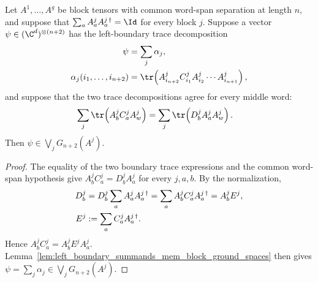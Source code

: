\begin{lemma}
    \label{lem:left_boundary_trace_decomposition_mem_block_ground_spaces}
    \leanok
    Let $A^1,\ldots,A^g$ be block tensors with common word-span separation at
    length $n$, and suppose that
    $\sum_a A^j_a A^{j\,\dagger}_a = \Id$
    for every block $j$. Suppose a vector
    $\psi\in(\C^d)^{\otimes(n+2)}$ has the left-boundary trace decomposition
    \begin{align}
        \psi
         & =
        \sum_j\alpha_j,
        \notag \\
        \alpha_j(i_1,\ldots,i_{n+2})
         & =
        \tr\!\left(A^j_{i_{n+2}} C^j_{i_1}
        A^j_{i_2}\cdots A^j_{i_{n+1}}\right),
        \notag
    \end{align}
    and suppose that the two trace decompositions agree for every middle word:
    \begin{align}
        \sum_j
        \tr\!\left(A^j_b C^j_a A^j_w\right)
         & =
        \sum_j
        \tr\!\left(D^j_b A^j_a A^j_w\right).
        \notag
    \end{align}
    Then
    $\psi \in \bigvee_j G_{n+2}(A^j)$.
\end{lemma}

\begin{proof}
    \leanok
    The equality of the two boundary trace expressions and the common word-span
    hypothesis give
    $A^j_bC^j_a = D^j_bA^j_a$
    for every $j,a,b$. By the normalization,
    \begin{align}
        D^j_b & = D^j_b\sum_a A^j_aA^{j\,\dagger}_a = \sum_a A^j_bC^j_aA^{j\,\dagger}_a = A^j_bE^j,
        \notag                                                                                      \\
        E^j   & := \sum_a C^j_aA^{j\,\dagger}_a.
        \notag
    \end{align}
    Hence $A^j_bC^j_a=A^j_bE^jA^j_a$.
    Lemma~\ref{lem:left_boundary_summands_mem_block_ground_spaces} then gives
    $\psi = \sum_j\alpha_j \in \bigvee_j G_{n+2}(A^j)$.
\end{proof}
